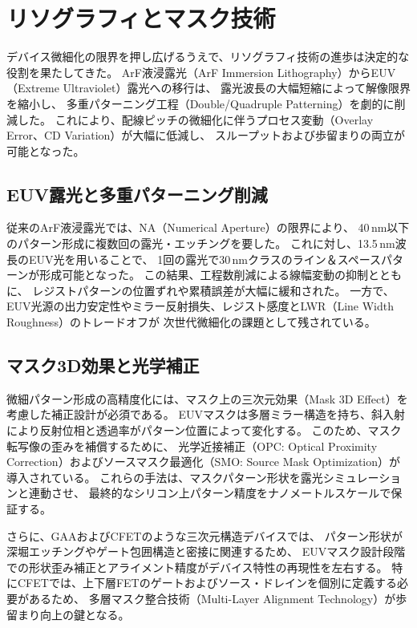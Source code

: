 \section{リソグラフィとマスク技術}
デバイス微細化の限界を押し広げるうえで、リソグラフィ技術の進歩は決定的な役割を果たしてきた。  
ArF液浸露光（ArF Immersion Lithography）からEUV（Extreme Ultraviolet）露光への移行は、  
露光波長の大幅短縮によって解像限界を縮小し、  
多重パターニング工程（Double/Quadruple Patterning）を劇的に削減した。  
これにより、配線ピッチの微細化に伴うプロセス変動（Overlay Error、CD Variation）が大幅に低減し、  
スループットおよび歩留まりの両立が可能となった。

\subsection{EUV露光と多重パターニング削減}
従来のArF液浸露光では、NA（Numerical Aperture）の限界により、  
40\,nm以下のパターン形成に複数回の露光・エッチングを要した。  
これに対し、13.5\,nm波長のEUV光を用いることで、  
1回の露光で30\,nmクラスのライン＆スペースパターンが形成可能となった。  
この結果、工程数削減による線幅変動の抑制とともに、  
レジストパターンの位置ずれや累積誤差が大幅に緩和された。  
一方で、EUV光源の出力安定性やミラー反射損失、レジスト感度とLWR（Line Width Roughness）のトレードオフが  
次世代微細化の課題として残されている。

\subsection{マスク3D効果と光学補正}
微細パターン形成の高精度化には、マスク上の三次元効果（Mask 3D Effect）を考慮した補正設計が必須である。  
EUVマスクは多層ミラー構造を持ち、斜入射により反射位相と透過率がパターン位置によって変化する。  
このため、マスク転写像の歪みを補償するために、  
光学近接補正（OPC: Optical Proximity Correction）およびソースマスク最適化（SMO: Source Mask Optimization）が導入されている。  
これらの手法は、マスクパターン形状を露光シミュレーションと連動させ、  
最終的なシリコン上パターン精度をナノメートルスケールで保証する。

さらに、GAAおよびCFETのような三次元構造デバイスでは、  
パターン形状が深堀エッチングやゲート包囲構造と密接に関連するため、  
EUVマスク設計段階での形状歪み補正とアライメント精度がデバイス特性の再現性を左右する。  
特にCFETでは、上下層FETのゲートおよびソース・ドレインを個別に定義する必要があるため、  
多層マスク整合技術（Multi-Layer Alignment Technology）が歩留まり向上の鍵となる。

